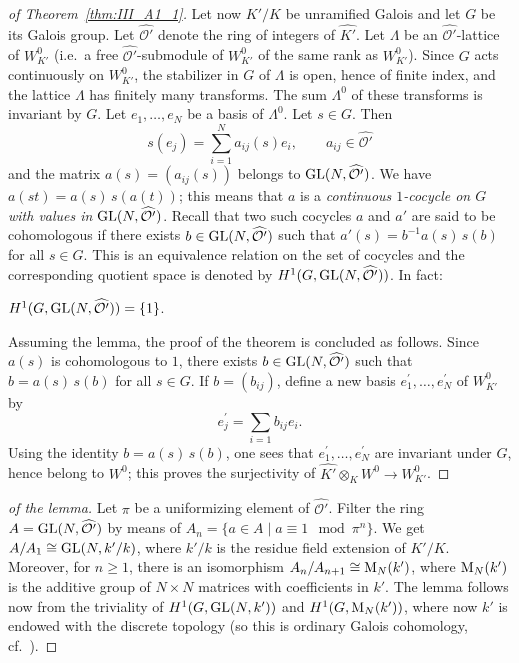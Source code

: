 \begin{subappendices}
\begin{proof}[ of Theorem~\ref{thm:III_A1_1}]
	Let now $K'/K$ be unramified Galois and let $G$ be its Galois group.
	Let $\widehat{\mathcal{O}'}$ denote the ring of integers of
	$\widehat{K'}$. Let $\Lambda$ be an $\widehat{\mathcal{O}'}$-lattice of
	$W_{K'}^0$ (i.e.\ a free $\widehat{\mathcal{O}'}$-submodule of
	$W_{K'}^0$ of the same rank as $W_{K'}^0$). Since $G$ acts continuously
	on $W_{K'}^0$, the stabilizer in $G$ of $\Lambda$ is open, hence of
	finite index, and the lattice $\Lambda$ has finitely many transforms.
	\dpage
	The sum $\Lambda^0$ of these transforms is invariant by $G$. Let $e_1,
	\dots, e_N$ be a basis of $\Lambda^0$. Let $s \in G$.  Then
	\[
		s(e_j) = \sum_{i=1}^{N} a_{ij}(s) e_i,
		\qquad a_{ij} \in \widehat{\mathcal{O}'}
	\]
	and the matrix $a(s) = (a_{ij}(s))$ belongs to $\operatorname{GL}(N,
	\widehat{\mathcal{O}'})$. We have $a(st) = a(s) \, s(a(t))$; this means
	that $a$ is a \emph{continuous $1$-cocycle on $G$ with values in
	$\operatorname{GL}(N, \widehat{\mathcal{O}'})$}. Recall that two such cocycles $a$
	and $a'$ are said to be cohomologous if there exists $b \in \operatorname{GL}(N,
	\widehat{\mathcal{O}'})$ such that $a'(s) = b^{-1} a(s) \, s(b)$ for
	all $s \in G$. This is an equivalence relation on the set of cocycles
	and the corresponding quotient space is denoted by $H^1(G, \operatorname{GL}(N,
	\widehat{\mathcal{O}'}))$. In fact:
	\begin{lem}
		$H^1(G, \operatorname{GL}(N, \widehat{\mathcal{O}'})) = \{ 1 \}$.
	\end{lem}
	Assuming the lemma, the proof of the theorem is concluded as follows.
	Since $a(s)$ is cohomologous to $1$, there exists $b \in \operatorname{GL}(N,
	\widehat{\mathcal{O}'})$ such that $b = a(s) \, s(b)$ for all $s \in
	G$. If $b = (b_{ij})$, define a new basis $e_1^\prime, \dots,
	e_N^\prime$ of $W^0_{K'}$ by
	\[
		e_j^\prime = \sum_{i=1} b_{ij} e_i.
	\]
	Using the identity $b = a(s) \, s(b)$, one sees that $e_1^\prime,
	\dots, e_N^\prime$ are invariant under $G$, hence belong to $W^0$; this
	proves the surjectivity of $\widehat{K'} \otimes_K W^0 \to W_{K'}^0$.
\end{proof}

\begin{proof}[ of the lemma]
	Let $\pi$ be a uniformizing element of $\widehat{\mathcal{O}'}$. Filter
	\dpage
	the ring $A = \operatorname{GL}(N, \widehat{\mathcal{O}'})$ by means of $A_n = \{a
	\in A \mid a \equiv 1 \mod{\pi^n} \}$. We get $A/A_1 \cong \operatorname{GL}(N, k' /
	k)$, where $k' / k$ is the residue field extension of $K' / K$.
	Moreover, for $n \ge 1$, there is an isomorphism \label{errata:An+k}
	$A_n / A_{n+1} \cong \operatorname{M}_N(k')$, where $\operatorname{M}_N(k')$ is the additive
	group of $N \times N$ matrices with coefficients in $k'$. The lemma
	follows now from the triviality of $H^1(G, \operatorname{GL}(N, k'))$ and $H^1(G,
	\operatorname{M}_N(k'))$, where now $k'$ is endowed with the discrete topology (so
	this is ordinary Galois cohomology, cf.\ \cite[158-159]{29}).
\end{proof}


\end{subappendices}
